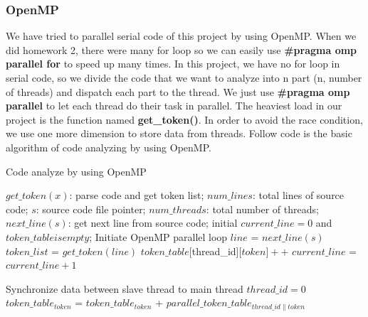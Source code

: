 \documentclass{acm_proc_article-sp}
\begin{document}
	
\subsubsection{OpenMP}
We have tried to parallel serial code of this project by using OpenMP. When we did homework 2, there were many for loop so we can easily use \textbf{\#pragma omp parallel for} to speed up many times. In this project, we have no for loop in serial code, so we divide the code that we want to analyze into n part (n, number of threads) and dispatch each part to the thread. We just use \textbf{\#pragma omp parallel} to let each thread do their task in parallel. The heaviest load in our project is the function named \textbf{get\_token()}. In order to avoid the race condition, we use one more dimension to store data from threads.
Follow code is the basic algorithm of code analyzing by using OpenMP.
\begin{algorithm}[h]
		\caption{Code analyze by using OpenMP}
		\begin{algorithmic}[1]
			\Require
				$get\_token(x)$: parse code and get token list;
				$num\_lines$: total lines of source code;
				$s$: source code file pointer;
				$num\_threads$: total number of threads;
				$next\_line(s)$: get next line from source code;
			\State initial $current\_line=0$ and $token\_table is empty$;
			\State Initiate OpenMP parallel loop
			\Repeat
				\State $line$ = $next\_line(s)$
				\State $token\_list$ = $get\_token(line)$
					\State $token\_table[$thread\_id][$token]++$
				\EndFor
				\State $current\_line$ = $current\_line + 1$

			\Comment Synchronize data between slave thread to main thread
				\State $thread\_id = 0$
					\State $token\_table_{token}$ = $token\_table_{token}$ + $parallel\_token\_table_{thread\_id\|token}$
				\EndWhile
			\EndFor
		\end{algorithmic}
\end{algorithm}
\end{document}
